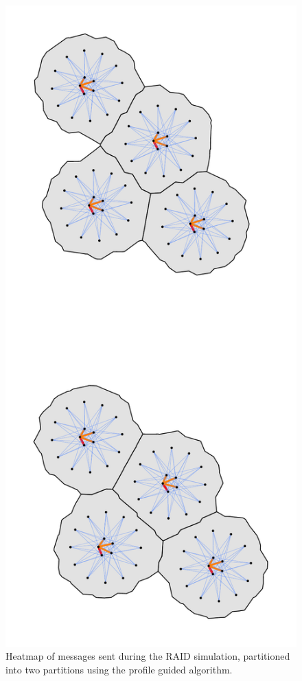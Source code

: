 \documentclass[11pt]{book}
\begin{document}
\begin{figure}
\centering
\includegraphics[width=\textwidth,height=0.9\textheight,keepaspectratio]{figs/RAID_2part}
\caption{Heatmap of messages sent during the RAID simulation, partitioned into two partitions using the profile guided algorithm.}
\end{figure}
\end{document}
